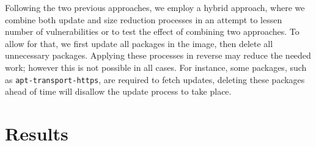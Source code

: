 \documentclass[a4paper,num-refs]{oup-contemporary}
\begin{document}
Following the two previous approaches, we employ a hybrid approach, where
we combine both update and size reduction processes in an attempt to
lessen number of vulnerabilities or to test the effect of
combining two approaches. To allow for that, we first update all packages in
the image, then delete all unnecessary packages. Applying these processes in reverse
may reduce the needed work; however this is not possible in all cases. For instance,
some packages, such as \texttt{apt-transport-https}, are required to fetch updates, deleting these packages
ahead of time will disallow the update process to take place.
%
\section{Results}
\end{document}
